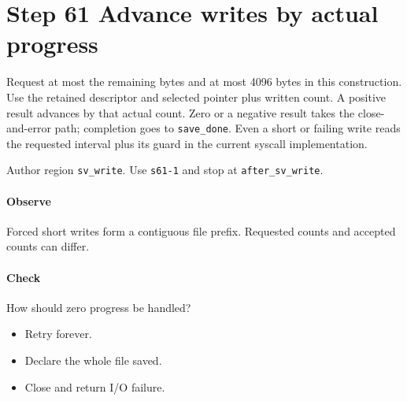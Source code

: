 \section{Step 61 Advance writes by actual progress}\label{pcm-wav-s61}
Request at most the remaining bytes and at most 4096 bytes in this construction. Use the retained descriptor and selected pointer plus written count. A positive result advances by that actual count. Zero or a negative result takes the close-and-error path; completion goes to \texttt{save\_done}. Even a short or failing write reads the requested interval plus its guard in the current syscall implementation.

Author region \texttt{sv\_write}. Use \texttt{s61-1} and stop at \texttt{after\_sv\_write}.

\paragraph{Observe} Forced short writes form a contiguous file prefix. Requested counts and accepted counts can differ.

\paragraph{Check} How should zero progress be handled?
\begin{itemize}
\item[A.] Retry forever.
\item[B.] Declare the whole file saved.
\item[C.] Close and return I/O failure.
\end{itemize}
